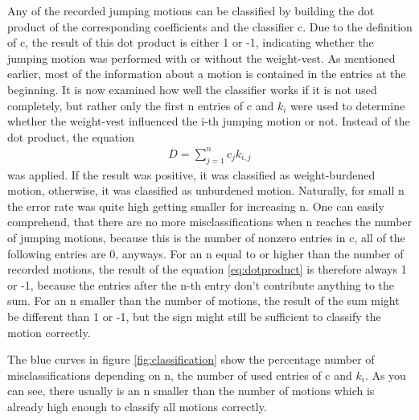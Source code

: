 \documentclass[a4paper]{article}
\begin{document}
Any of the recorded jumping motions can be classified by building the dot product of the corresponding coefficients and the classifier c.
Due to the definition of c, the result of this dot product is either 1 or -1, indicating whether the jumping motion was performed with or without the weight-vest.
As mentioned earlier, most of the information about a motion is contained in the entries at the beginning.
It is now examined how well the classifier works if it is not used completely, but rather only the first n entries of c and $k_{i}$ were used to determine whether the weight-vest influenced the i-th jumping motion or not.
Instead of the dot product, the equation
\begin{align}
	D=\sum\limits_{j=1}^n c_{j} k_{i,j} \label{eq:dotproduct}
\end{align} 
was applied. If the result was positive, it was classified as weight-burdened motion, otherwise, it was classified as unburdened motion.
Naturally, for small n the error rate was quite high getting smaller for increasing n.
One can easily comprehend, that there are no more misclassifications when n reaches the number of jumping motions, because this is the number of nonzero entries in c, all of the following entries are 0, anyways.
For an n equal to or higher than the number of recorded motions, the result of the equation \ref{eq:dotproduct} is therefore always 1 or -1, because the entries after the n-th entry don't contribute anything to the sum.
For an n smaller than the number of motions, the result of the sum might be different than 1 or -1, but the sign might still be sufficient to classify the motion correctly.

The blue curves in figure \ref{fig:classification} show the percentage number of misclassifications depending on n, the number of used entries of c and $k_{i}$. As you can see, there usually is an n smaller than the number of motions which is already high enough to classify all motions correctly.
\end{document}
